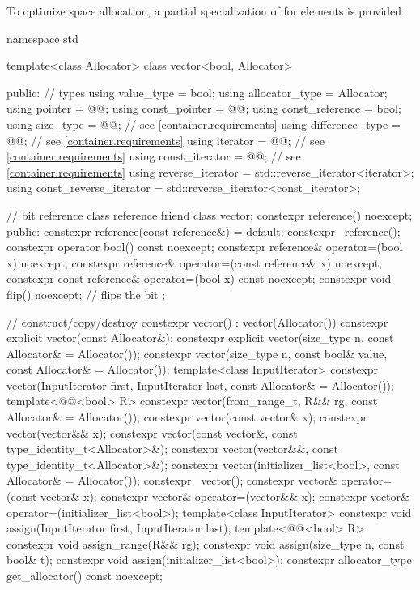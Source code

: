 \pnum
{}%
To optimize space allocation, a partial specialization of  for
 elements is provided:
\begin{codeblock}
namespace std {
  template<class Allocator>
  class vector<bool, Allocator> {
  public:
    // types
    using value_type             = bool;
    using allocator_type         = Allocator;
    using pointer                = @@;
    using const_pointer          = @@;
    using const_reference        = bool;
    using size_type              = @@; // see \ref{container.requirements}
    using difference_type        = @@; // see \ref{container.requirements}
    using iterator               = @@; // see \ref{container.requirements}
    using const_iterator         = @@; // see \ref{container.requirements}
    using reverse_iterator       = std::reverse_iterator<iterator>;
    using const_reverse_iterator = std::reverse_iterator<const_iterator>;

    // bit reference
    class reference {
      friend class vector;
      constexpr reference() noexcept;
    public:
      constexpr reference(const reference&) = default;
      constexpr ~reference();
      constexpr operator bool() const noexcept;
      constexpr reference& operator=(bool x) noexcept;
      constexpr reference& operator=(const reference& x) noexcept;
      constexpr const reference& operator=(bool x) const noexcept;
      constexpr void flip() noexcept;   // flips the bit
    };

    // construct/copy/destroy
    constexpr vector() : vector(Allocator()) { }
    constexpr explicit vector(const Allocator&);
    constexpr explicit vector(size_type n, const Allocator& = Allocator());
    constexpr vector(size_type n, const bool& value, const Allocator& = Allocator());
    template<class InputIterator>
      constexpr vector(InputIterator first, InputIterator last, const Allocator& = Allocator());
    template<@@<bool> R>
      constexpr vector(from_range_t, R&& rg, const Allocator& = Allocator());
    constexpr vector(const vector& x);
    constexpr vector(vector&& x);
    constexpr vector(const vector&, const type_identity_t<Allocator>&);
    constexpr vector(vector&&, const type_identity_t<Allocator>&);
    constexpr vector(initializer_list<bool>, const Allocator& = Allocator());
    constexpr ~vector();
    constexpr vector& operator=(const vector& x);
    constexpr vector& operator=(vector&& x);
    constexpr vector& operator=(initializer_list<bool>);
    template<class InputIterator>
      constexpr void assign(InputIterator first, InputIterator last);
    template<@@<bool> R>
      constexpr void assign_range(R&& rg);
    constexpr void assign(size_type n, const bool& t);
    constexpr void assign(initializer_list<bool>);
    constexpr allocator_type get_allocator() const noexcept;

}}
\end{codeblock}
